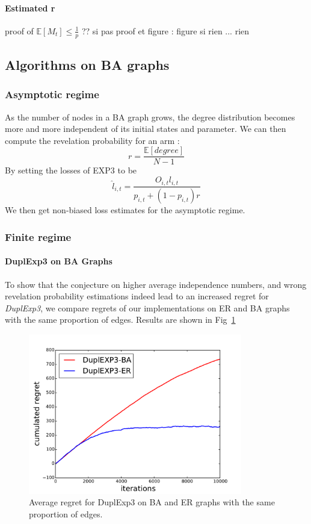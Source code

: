 \documentclass[10pt,a4paper]{scrartcl}
\providecommand{\E}{\mathbb{E}}
\begin{document}
\paragraph{Estimated r}
proof of $\E[M_t] \leq \frac{1}{p}$ ??
si pas proof et figure : figure
si rien ... rien


\subsection{Algorithms on BA graphs}
\subsubsection{Asymptotic regime}
As the number of nodes in a BA graph grows, the degree distribution becomes more and more independent of its initial states and parameter. We can then compute the revelation probability for an arm :
$$r = \frac{\E[degree]}{N-1}$$
By setting the losses of EXP3 to be 
$$\hat{l}_{i,t} = \frac{O_{i,t}l_{i,t}}{p_{i,t}+(1-p_{i,t})r}$$
We then get non-biased loss estimates for the asymptotic regime.


\subsubsection{Finite regime}
\paragraph{DuplExp3 on BA Graphs}
To show that the conjecture on higher average independence numbers, and wrong revelation probability estimations indeed lead to an increased regret for \emph{DuplExp3}, we compare regrets of our implementations on ER and BA graphs with the same proportion of edges. Results are shown in Fig~\ref{dupl_er_ba}

\begin{figure}[h!]
\centering
 \includegraphics[height=7cm]{figures/50compare_dupl_er_ba.pdf}
 \caption{Average regret for DuplExp3 on BA and ER graphs with the same proportion of edges.}
 \label{dupl_er_ba}
\end{figure}
\end{document}
